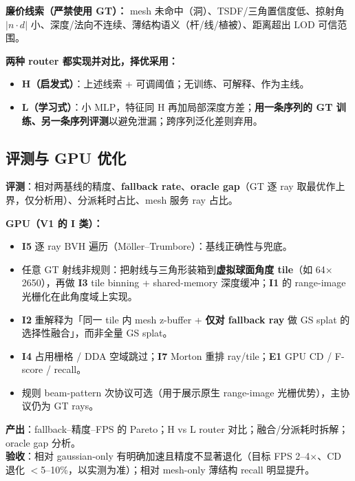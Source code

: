 \documentclass[10pt,a4paper]{article}
\begin{document}
\begin{tcolorbox}[colback=green!3,colframe=cgreen!55,boxrule=0.5pt,arc=2pt,left=4pt,right=4pt,top=2pt,bottom=2pt]
\small\textbf{廉价线索（严禁使用 GT）：} mesh 未命中（洞）、TSDF/三角置信度低、掠射角 $|n\cdot d|$ 小、深度/法向不连续、薄结构语义（杆/线/植被）、距离超出 LOD 可信范围。
\end{tcolorbox}

\textbf{两种 router 都实现并对比，择优采用：}
\begin{itemize}
\item \textbf{H（启发式）}：上述线索 + 可调阈值；无训练、可解释、作为主线。
\item \textbf{L（学习式）}：小 MLP，特征同 H 再加局部深度方差；\textbf{用一条序列的 GT 训练、另一条序列评测}以避免泄漏；跨序列泛化差则弃用。
\end{itemize}

\subsection{评测与 GPU 优化}
\textbf{评测}：相对两基线的精度、\textbf{fallback rate}、\textbf{oracle gap}（GT 逐 ray 取最优作上界，仅分析用）、分派耗时占比、mesh 服务 ray 占比。

\textbf{GPU（V1 的 I 类）：}
\begin{itemize}
\item \textbf{I5} 逐 ray BVH 遍历（Möller--Trumbore）：基线正确性与兜底。
\item 任意 GT 射线非规则：把射线与三角形装箱到\textbf{虚拟球面角度 tile}（如 64$\times$2650），再做 \textbf{I3} tile binning + shared-memory 深度缓冲；\textbf{I1} 的 range-image 光栅化在此角度域上实现。
\item \textbf{I2} 重解释为「同一 tile 内 mesh z-buffer + \textbf{仅对 fallback ray} 做 GS splat 的选择性融合」，而非全量 GS splat。
\item \textbf{I4} 占用栅格 / DDA 空域跳过；\textbf{I7} Morton 重排 ray/tile；\textbf{E1} GPU CD / F-score / recall。
\item 规则 beam-pattern 次协议可选（用于展示原生 range-image 光栅优势），主协议仍为 GT rays。
\end{itemize}

\textbf{产出}：fallback--精度--FPS 的 Pareto；H vs L router 对比；融合/分派耗时拆解；oracle gap 分析。\\
\textbf{验收}：相对 gaussian-only 有明确加速且精度不显著退化（目标 FPS 2--4$\times$、CD 退化 $<$5--10\%，以实测为准）；相对 mesh-only 薄结构 recall 明显提升。
\end{document}
